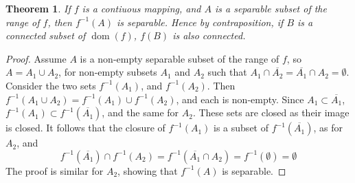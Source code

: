 \documentclass{report}
\newtheorem{theorem}{Theorem}[chapter]
\DeclareMathOperator{\dom}{dom}
\begin{document}
\begin{theorem}
  If $f$ is a contiuous mapping, and $A$ is a separable subset of the range of $f$, then $f^{-1}(A)$ is separable. Hence by contraposition, if $B$ is a connected subset of $\dom(f)$, $f(B)$ is also connected.
\end{theorem}
\begin{proof}
  Assume $A$ is a non-empty separable subset of the range of $f$, so $A = A_1 \cup A_2$, for non-empty subsets $A_1$ and $A_2$ such that $A_1 \cap \overline{A_2} = \overline{A_1} \cap A_2 = \emptyset$. Consider the two sets $f^{-1}(A_1)$, and $f^{-1}(A_2)$. Then $f^{-1}(A_1 \cup A_2) = f^{-1}(A_1) \cup f^{-1}(A_2)$, and each is non-empty. Since $A_1 \subset \overline{A_1}$, $f^{-1}(A_1) \subset f^{-1}(\overline{A_1})$, and the same for $A_2$. These sets are closed as their image is closed. It follows that the closure of $f^{-1}(A_1)$ is a subset of $f^{-1}(\overline{A_1})$, as for $A_2$, and
  \[ f^{-1}(\overline{A_1}) \cap f^{-1}(A_2) = f^{-1}(\overline{A_1} \cap A_2) = f^{-1}(\emptyset) = \emptyset \]
  The proof is similar for $A_2$, showing that $f^{-1}(A)$ is separable.
\end{proof}
\end{document}
